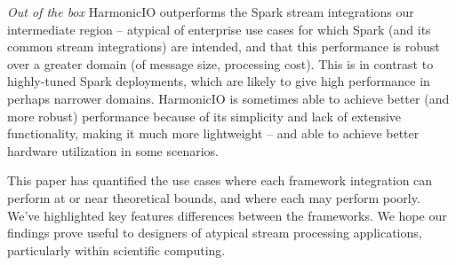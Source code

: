 \documentclass[letterpaper,conference]{IEEEtran}
\begin{document}
\emph{Out of the box} HarmonicIO outperforms the Spark stream integrations our intermediate region -- atypical of enterprise use cases for which Spark (and its common stream integrations) are intended, and that this performance is robust over a greater domain (of message size, processing cost). This is in contrast to highly-tuned Spark deployments, which are likely to give high performance in perhaps narrower domains. HarmonicIO is sometimes able to achieve better (and more robust) performance because of its simplicity and lack of extensive functionality, making it much more lightweight -- and able to achieve better hardware utilization in some scenarios.

This paper has quantified the use cases where each framework integration can perform at or near theoretical bounds, and where each may perform poorly. We've highlighted key features differences between the frameworks. We hope our findings prove useful 
to designers of atypical stream processing applications, particularly within scientific computing.

\end{document}
